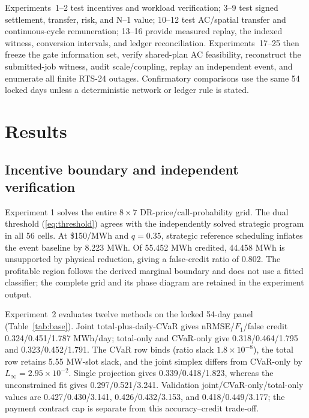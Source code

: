 \documentclass[10pt,journal]{IEEEtran}
\begin{document}
Experiments~1--2 test incentives and workload verification; 3--9 test signed
settlement, transfer, risk, and N--1 value; 10--12 test AC/spatial transfer and
continuous-cycle remuneration; 13--16 provide measured replay, the indexed
witness, conversion intervals, and ledger reconciliation. Experiments~17--25
then freeze the gate information set, verify shared-plan AC feasibility,
reconstruct the submitted-job witness, audit scale/coupling, replay an
independent event, and enumerate all finite RTS-24 outages. Confirmatory
comparisons use the same 54 locked days unless a deterministic network or
ledger rule is stated.

\section{Results}\label{sec:results}

\subsection{Incentive boundary and independent verification}

Experiment 1 solves the entire $8\times7$ DR-price/call-probability grid.
The dual threshold (\ref{eq:threshold}) agrees with the independently solved
strategic program in all 56 cells. At \$150/MWh and $q=0.35$, strategic
reference scheduling inflates the event baseline by 8.223 MWh. Of
55.452 MWh credited, 44.458 MWh is unsupported by physical reduction,
giving a false-credit ratio of 0.802. The profitable region follows the derived
marginal boundary and does not use a fitted classifier; the complete grid and
its phase diagram are retained in the experiment output.

Experiment~2 evaluates twelve methods on the locked 54-day panel
(Table~\ref{tab:base}). Joint total-plus-daily-CVaR gives
nRMSE/$F_1$/false credit 0.324/0.451/1.787 MWh/day; total-only and CVaR-only
give 0.318/0.464/1.795 and 0.323/0.452/1.791. The CVaR row binds (ratio slack
$1.8\times10^{-8}$), the total row retains 5.55 MW-slot slack, and the joint
simplex differs from CVaR-only by $L_\infty=2.95\times10^{-2}$. Single
projection gives 0.339/0.418/1.823, whereas the unconstrained fit gives
0.297/0.521/3.241. Validation joint/CVaR-only/total-only values are
0.427/0.430/3.141, 0.426/0.432/3.153, and 0.418/0.449/3.177; the payment
contract cap is separate from this accuracy--credit trade-off.
\end{document}
